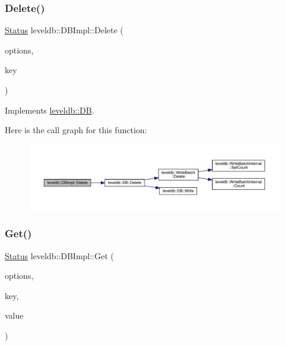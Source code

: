 \subsubsection{\texorpdfstring{Delete()}{Delete()}}
{\footnotesize\ttfamily \mbox{\hyperlink{classleveldb_1_1_status}{Status}} leveldb\+::\+D\+B\+Impl\+::\+Delete (\begin{DoxyParamCaption}\item[{const \mbox{\hyperlink{structleveldb_1_1_write_options}{Write\+Options}} \&}]{options,  }\item[{const \mbox{\hyperlink{classleveldb_1_1_slice}{Slice}} \&}]{key }\end{DoxyParamCaption})\hspace{0.3cm}{\ttfamily [virtual]}}



Implements \mbox{\hyperlink{classleveldb_1_1_d_b_aff7577239799cd059464701c548090b9}{leveldb\+::\+DB}}.

Here is the call graph for this function\+:
\nopagebreak
\begin{figure}[H]
\begin{center}
\leavevmode
\includegraphics[width=350pt]{classleveldb_1_1_d_b_impl_af050f77e8c22bd6638fed5a46a59399d_cgraph}
\end{center}
\end{figure}
\mbox{\label{classleveldb_1_1_d_b_impl_a089964ddcd1f5dc85e73499ae57be508}} 
\subsubsection{\texorpdfstring{Get()}{Get()}}
{\footnotesize\ttfamily \mbox{\hyperlink{classleveldb_1_1_status}{Status}} leveldb\+::\+D\+B\+Impl\+::\+Get (\begin{DoxyParamCaption}\item[{const \mbox{\hyperlink{structleveldb_1_1_read_options}{Read\+Options}} \&}]{options,  }\item[{const \mbox{\hyperlink{classleveldb_1_1_slice}{Slice}} \&}]{key,  }\item[{std\+::string $\ast$}]{value }\end{DoxyParamCaption})\hspace{0.3cm}{\ttfamily [virtual]}}



